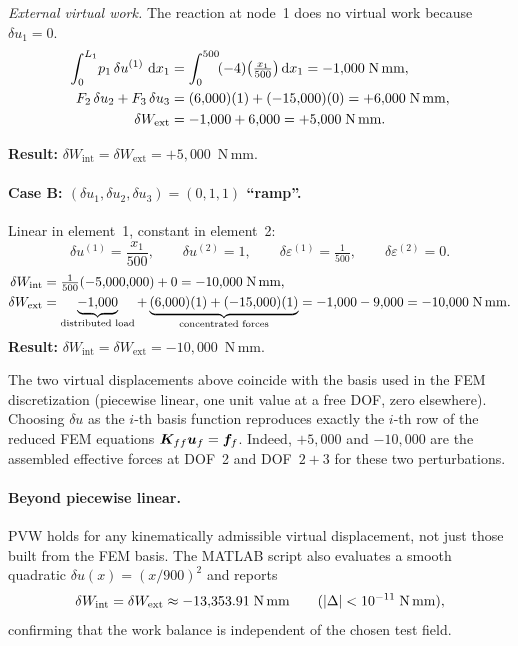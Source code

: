 \begin{example}[Numerical verification of $\delta W_{\mathrm{int}} = \delta W_{\mathrm{ext}}$]
\noindent\emph{External virtual work.}
The reaction at node~1 does no virtual work because $\delta u_1 = 0$.
\begin{align*}
   \int_0^{L_1}\! p_1\,\delta u^{(1)}\,\,\mathrm{d} x_1
   &= \int_0^{500}\!(-4)\!\left(\tfrac{x_1}{500}\right)\!\,\mathrm{d} x_1
    = -1{,}000\;\text{N\,mm}, \\
   F_2\,\delta u_2 + F_3\,\delta u_3
   &= (6{,}000)(1) + (-15{,}000)(0) = +6{,}000\;\text{N\,mm}, \\
   \delta W_{\mathrm{ext}}
   &= -1{,}000 + 6{,}000 = +5{,}000 \;\text{N\,mm}.
\end{align*}

\noindent\textbf{Result:} $\delta W_{\mathrm{int}} = \delta W_{\mathrm{ext}} = +5{,}000$~N\,mm. \hfill\checkmark

\paragraph{Case B: $(\delta u_1,\delta u_2,\delta u_3) = (0,1,1)$ ``ramp''.}

Linear in element~1, constant in element~2:
\[
   \delta u^{(1)} = \frac{x_1}{500},\qquad \delta u^{(2)} = 1,
   \qquad
   \delta\varepsilon^{(1)} = \tfrac{1}{500},\qquad \delta\varepsilon^{(2)} = 0 .
\]
\begin{align*}
   \delta W_{\mathrm{int}}
   &= \tfrac{1}{500}(-5{,}000{,}000) + 0 = -10{,}000\;\text{N\,mm}, \\
   \delta W_{\mathrm{ext}}
   &= \underbrace{-1{,}000}_{\text{distributed load}}
    + \underbrace{(6{,}000)(1) + (-15{,}000)(1)}_{\text{concentrated forces}}
    = -1{,}000 - 9{,}000 = -10{,}000\;\text{N\,mm}.
\end{align*}
\textbf{Result:} $\delta W_{\mathrm{int}} = \delta W_{\mathrm{ext}} = -10{,}000$~N\,mm. \hfill\checkmark

\medskip

The two virtual displacements above coincide with the basis used in the FEM
discretization (piecewise linear, one unit value at a free DOF, zero
elsewhere). Choosing $\delta u$ as the $i$-th basis function reproduces
exactly the $i$-th row of the reduced FEM equations $\bm{K}_{ff}\bm{u}_f =
\bm{f}_f$. Indeed, $+5{,}000$ and $-10{,}000$ are the assembled effective
forces at DOF~2 and DOF~$2{+}3$ for these two perturbations.

\paragraph{Beyond piecewise linear.}
PVW holds for any kinematically admissible virtual displacement, not just
those built from the FEM basis. The MATLAB script
 also evaluates a smooth quadratic
$\delta u(x) = (x/900)^2$ and reports
\[
   \delta W_{\mathrm{int}} = \delta W_{\mathrm{ext}} \approx -13{,}353.91 \;\text{N\,mm}
   \qquad (|\Delta| < 10^{-11}\;\text{N\,mm}) ,
\]
confirming that the work balance is independent of the chosen test field.


\end{example}
